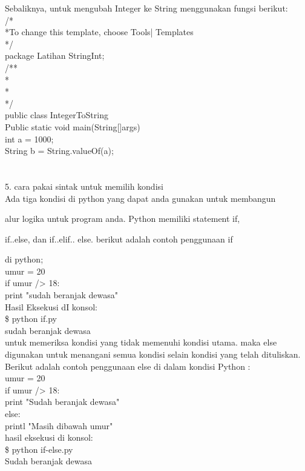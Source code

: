     Sebaliknya, untuk mengubah Integer ke String menggunakan fungsi berikut:\\
    
    /*\\
    *To change this template, choose Tools| Templates\\
    */\\
    package Latihan StringInt;\\
    /**\\
   *\\
    *\\
    */\\
    public class IntegerToString {\\
    Public static void main(String[]args){\\
    int a = 1000;\\
    String b = String.valueOf(a);\\
    }\\
    }\\
5. cara pakai sintak untuk memilih kondisi\\
Ada tiga kondisi di python yang dapat anda gunakan untuk membangun

alur logika untuk program anda. Python memiliki statement if,

if..else, dan if..elif.. else. berikut adalah contoh penggunaan if

di python;\\
umur = 20\\
if umur /> 18:\\
print "sudah beranjak dewasa"\\

Hasil Eksekusi dI konsol:\\
\$ python if.py\\
sudah beranjak dewasa\\

untuk memeriksa kondisi yang tidak memenuhi kondisi utama. maka else
digunakan untuk menangani semua kondisi selain kondisi yang telah
dituliskan. Berikut adalah contoh penggunaan else di dalam kondisi
Python : \\
umur = 20 \\
if umur /> 18:\\
print "Sudah beranjak dewasa"\\
else:\\
printl "Masih dibawah umur"\\
hasil eksekusi di konsol: \\
\$ python if-else.py\\
Sudah beranjak dewasa

